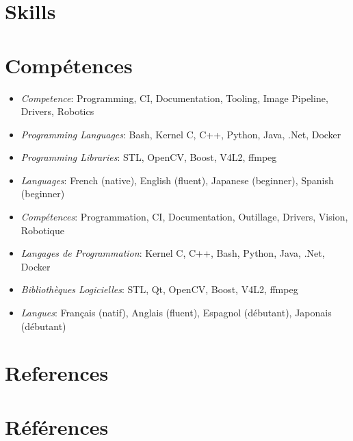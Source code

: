 \documentclass{resume}
\begin{document}
 {
  \section{{\faClipboardCheck} Skills}
} {
  \section{{\faClipboardCheck} Comp\'{e}tences}
}

 {
  \begin{itemize}
    \item {\em Competence}: Programming, CI, Documentation, Tooling, Image Pipeline, Drivers, Robotics \\
    \item {\em Programming Languages}: Bash, Kernel C, C++, Python, Java, .Net, Docker \\
    \item {\em Programming Libraries}: STL, OpenCV, Boost, V4L2, ffmpeg \\
    \item {\em Languages}: French (native), English (fluent), Japanese (beginner), Spanish (beginner) \\
  \end{itemize}
} {
  \begin{itemize}
    \item {\em Comp\'{e}tences}: Programmation, CI, Documentation, Outillage, Drivers, Vision, Robotique \\
    \item {\em Langages de Programmation}: Kernel C, C++, Bash, Python, Java, .Net, Docker \\
    \item {\em Biblioth\`{e}ques Logicielles}: STL, Qt, OpenCV, Boost, V4L2, ffmpeg \\
    \item {\em Langues}: Fran\c{c}ais (natif), Anglais (fluent), Espagnol (d\'{e}butant), Japonais (d\'{e}butant) \\
  \end{itemize}
}

 {
  \section{{\faAddressBook} References}
} {
  \section{{\faAddressBook} R\'{e}f\'{e}rences}
}
\end{document}
